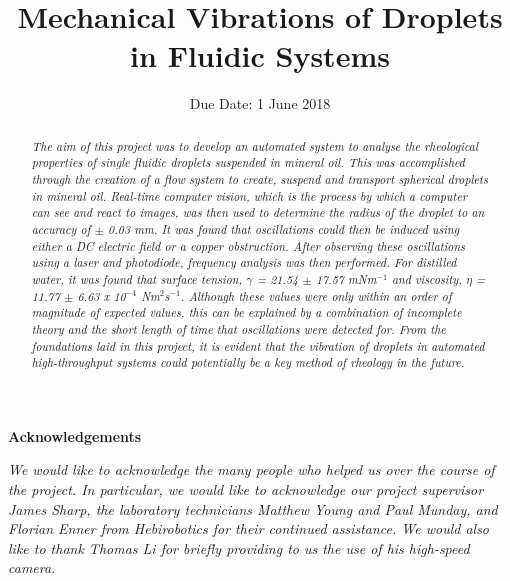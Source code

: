 \documentclass{physics_article_B}
\title{Mechanical Vibrations of Droplets in Fluidic Systems}
\date{Due Date: 1 June 2018}
\begin{document}
    
\setcounter{page}{0}

\newpage

\setcounter{page}{1}
\begin{abstract}
    \large{\textit{The aim of this project was to develop an automated system to analyse the rheological properties of single fluidic droplets suspended in mineral oil. This was accomplished through the creation of a flow system to create, suspend and transport spherical droplets in mineral oil. Real-time computer vision, which is the process by which a computer can see and react to images, was then used to determine the radius of the droplet to an accuracy of $\pm$ 0.03 mm. It was found that oscillations could then be induced using either a DC electric field or a copper obstruction. After observing these oscillations using a laser and photodiode, frequency analysis was then performed. For distilled water, it was found that surface tension, $\gamma$ = 21.54 $\pm$ 17.57 mNm$^{-1}$ and viscosity, $\eta$ = 11.77 $\pm$ 6.63 x 10$^{-4}$ Nm$^{2}$s$^{-1}$. Although these values were only within an order of magnitude of expected values, this can be explained by a combination of incomplete theory and the short length of time that oscillations were detected for. From the foundations laid in this project, it is evident that the vibration of droplets in automated high-throughput systems could potentially be a key method of rheology in the future.}}
\end{abstract}

\begin{center}
\vspace{0.4cm}
{\Large\bf{Acknowledgements}} \\
\end{center}

\begin{changemargin}{1cm}{1cm} 
\textit{We would like to acknowledge the many people who helped us over the course of the project. In particular, we would like to acknowledge our project supervisor James Sharp, the laboratory technicians Matthew Young and Paul Munday, and Florian Enner from Hebirobotics for their continued assistance. We would also like to thank Thomas Li for briefly providing to us the use of his high-speed camera.}


\end{changemargin}
\vspace*{\fill}
\end{document}

